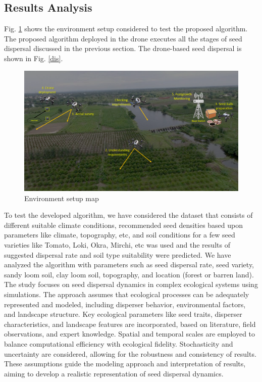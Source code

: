 \documentclass[conference]{IEEEtran}
\begin{document}
\subsection{Results Analysis}
Fig. \ref{env} shows the environment setup considered to test the proposed algorithm. The proposed algorithm deployed in the drone executes all the stages of seed dispersal discussed in the previous section. The drone-based seed dispersal is shown in Fig. \ref{dis}.
\begin{figure}[H]
    \centering
    \includegraphics[scale=0.2]{hornbill.png}
    \caption{Environment setup map}
    \label{env}
\end{figure}
To test the developed algorithm, we have considered the dataset that consists of different suitable climate conditions, recommended seed densities based upon parameters like climate, topography, etc, and soil conditions for a few seed varieties like Tomato, Loki, Okra, Mirchi, etc was used and the results of suggested dispersal rate and soil type suitability were predicted.
We have analyzed the algorithm with parameters such as seed dispersal rate, seed variety, sandy loom soil, clay loom soil, topography, and location (forest or barren land). 
The study focuses on seed dispersal dynamics in complex ecological systems using simulations. The approach assumes that ecological processes can be adequately represented and modeled, including disperser behavior, environmental factors, and landscape structure. Key ecological parameters like seed traits, disperser characteristics, and landscape features are incorporated, based on literature, field observations, and expert knowledge. Spatial and temporal scales are employed to balance computational efficiency with ecological fidelity. Stochasticity and uncertainty are considered, allowing for the robustness and consistency of results. These assumptions guide the modeling approach and interpretation of results, aiming to develop a realistic representation of seed dispersal dynamics.
\end{document}
